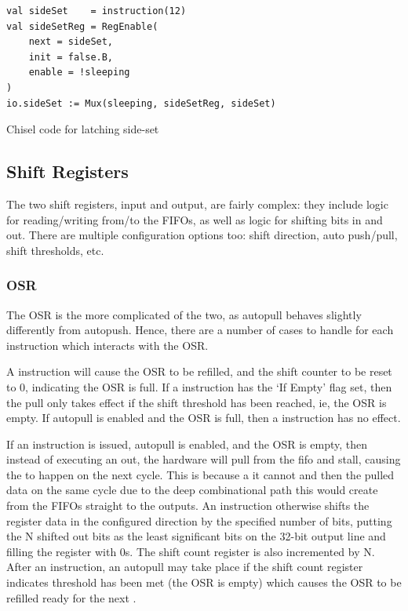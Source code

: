 \begin{listing}[h!]
    \vspace{0.5cm}
    \begin{verbatim}
val sideSet    = instruction(12)
val sideSetReg = RegEnable(
    next = sideSet, 
    init = false.B, 
    enable = !sleeping
)
io.sideSet := Mux(sleeping, sideSetReg, sideSet)
    \end{verbatim}
    \caption{Chisel code for latching side-set}
    \label{lst:side-set}
\end{listing}



\subsection{Shift Registers}

The two shift registers, input and output, are fairly complex: they include logic for reading/writing from/to the FIFOs, as well as logic for shifting bits in and out. There are multiple configuration options too: shift direction, auto push/pull, shift thresholds, etc.


\subsubsection{OSR}

The OSR is the more complicated of the two, as autopull behaves slightly differently from autopush. Hence, there are a number of cases to handle for each instruction which interacts with the OSR.

A  instruction will cause the OSR to be refilled, and the shift counter to be reset to 0, indicating the OSR is full. If a  instruction has the `If Empty' flag set, then the pull only takes effect if the shift threshold has been reached, ie, the OSR is empty. If autopull is enabled and the OSR is full, then a  instruction has no effect.

If an  instruction is issued, autopull is enabled, and the OSR is empty, then instead of executing an out, the hardware will pull from the fifo and stall, causing the  to happen on the next cycle. This is because a it cannot  and then  the pulled data on the same cycle due to the deep combinational path this would create from the FIFOs straight to the outputs. An  instruction otherwise shifts the register data in the configured direction by the specified number of bits, putting the N shifted out bits as the least significant bits on the 32-bit output line and filling the register with 0s. The shift count register is also incremented by N. After an  instruction, an autopull may take place if the shift count register indicates threshold has been met (the OSR is empty) which causes the OSR to be refilled ready for the next .

